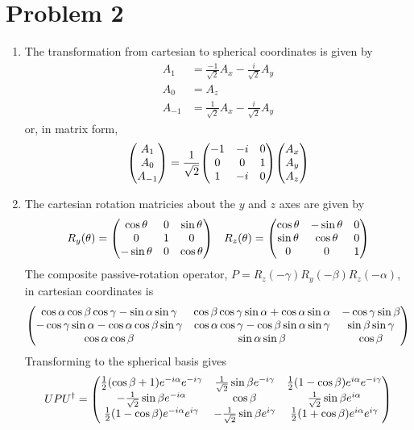 \documentclass[12pt]{article}
\begin{document}
\section*{Problem 2}
\begin{enumerate}[label=(\alph*)]
    \item The transformation from cartesian to spherical coordinates is given by
    \begin{align*}
        A_1 & = \frac{-1}{\sqrt{2}}A_x - \frac{i}{\sqrt{2}}A_y \\
        A_0 & = A_z \\
        A_{-1} & = \frac{1}{\sqrt{2}}A_x - \frac{i}{\sqrt{2}}A_y
    \end{align*}
    or, in matrix form,
    \[ \mqty(A_1\\A_0\\A_{-1}) = \frac{1}{\sqrt{2}}\mqty(-1&-i&0\\0&0&1\\1&-i&0)\mqty(A_x\\A_y\\A_z) \]
    
    \item The cartesian rotation matricies about the $y$ and $z$ axes are given by 
    \[ R_y(\theta) = \mqty(\cos\theta & 0 & \sin\theta \\ 0&1&0 \\ -\sin\theta & 0 & \cos\theta) \quad R_z(\theta) = \mqty(\cos\theta & -\sin\theta & 0 \\ \sin\theta & \cos\theta & 0 \\ 0&0&1) \]
    The composite passive-rotation operator, $P = R_z(-\gamma)R_y(-\beta)R_z(-\alpha)$, in cartesian coordinates is
    \[ \mqty(\cos\alpha\cos\beta\cos\gamma-\sin\alpha\sin\gamma & \cos\beta\cos\gamma\sin\alpha + \cos\alpha\sin\alpha & - \cos\gamma\sin\beta \\ -\cos\gamma\sin\alpha - \cos\alpha\cos\beta\sin\gamma & \cos\alpha\cos\gamma - \cos\beta\sin\alpha\sin\gamma & \sin\beta\sin\gamma \\ \cos\alpha\cos\beta & \sin\alpha\sin\beta & \cos\beta) \]
    Transforming to the spherical basis gives
    \[ UPU^\dag = \mqty(\frac{1}{2}(\cos\beta + 1)e^{-i\alpha}e^{-i\gamma} & \frac{1}{\sqrt{2}}\sin\beta e^{-i\gamma} & \frac{1}{2}(1 - \cos\beta)e^{i\alpha}e^{-i\gamma} \\ -\frac{1}{\sqrt{2}}\sin\beta e^{-i\alpha} & \cos\beta & \frac{1}{\sqrt{2}}\sin\beta e^{i\alpha} \\ \frac{1}{2}(1 - \cos\beta)e^{-i\alpha}e^{i\gamma} & -\frac{1}{\sqrt{2}}\sin\beta e^{i\gamma} & \frac{1}{2}(1 + \cos\beta)e^{i\alpha}e^{i\gamma}) \]
    

\end{enumerate}
\end{document}
